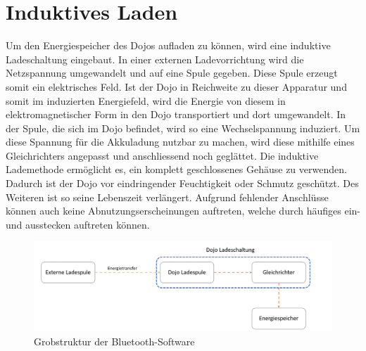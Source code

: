 \section{Induktives Laden}
Um den Energiespeicher des Dojos aufladen zu können, wird eine induktive Ladeschaltung eingebaut. In einer externen Ladevorrichtung wird die Netzspannung umgewandelt und auf eine Spule gegeben. Diese Spule erzeugt somit ein elektrisches Feld. Ist der Dojo in Reichweite zu dieser Apparatur und somit im induzierten Energiefeld, wird die Energie von diesem in elektromagnetischer Form in den Dojo transportiert und dort umgewandelt. In der Spule, die sich im Dojo befindet, wird so eine Wechselspannung induziert. Um diese Spannung für die Akkuladung nutzbar zu machen, wird diese mithilfe eines Gleichrichters angepasst und anschliessend noch geglättet. Die induktive Lademethode ermöglicht es, ein komplett geschlossenes Gehäuse zu verwenden. Dadurch ist der Dojo vor eindringender Feuchtigkeit oder Schmutz geschützt. Des Weiteren ist so seine Lebenszeit verlängert. Aufgrund fehlender Anschlüsse können auch keine Abnutzungserscheinungen auftreten, welche durch häufiges ein- und ausstecken auftreten können. 

\begin{figure}[H]
\begin{center}
	\includegraphics[width=160mm]{data/Induktion.png}
	\caption{Grobstruktur der Bluetooth-Software} %
	\label{fig:induktiv}
\end{center}
\end{figure}